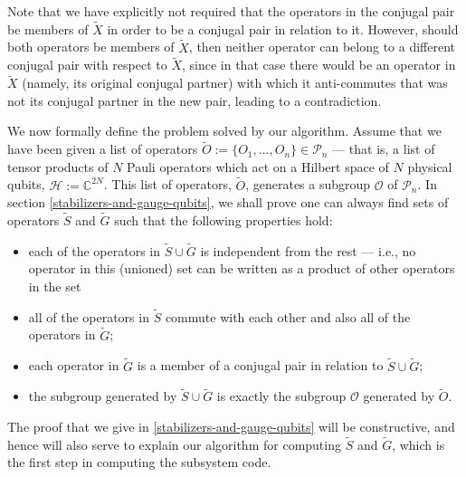 \documentclass[twocolumn,showpacs,preprintnumbers,amsmath,amssymb,nofootinbib,pra,floatfix]{revtex4}
\newcommand{\set}{\tilde}
\begin{document}
Note that we have explicitly not required that the operators in the conjugal pair be members of $\set X$ in order to be a conjugal pair in relation to it.  However, should both operators be members of $\set X$, then neither operator can belong to a different conjugal pair with respect to $\set X$, since in that case there would be an operator in $\set X$ (namely, its original conjugal partner) with which it anti-commutes that was not its conjugal partner in the new pair, leading to a contradiction.

We now formally define the problem solved by our algorithm.  Assume that we have been given a list of operators $\set O :=\{O_1,\dots,O_n\}\in \mathcal{P}_n$ --- that is, a list of tensor products of $N$ Pauli operators which act on a Hilbert space of $N$ physical qubits, $\mathscr{H}:=\mathbb{C}^{2N}$.  This list of operators, $\set O$, generates a subgroup $\mathcal{O}$ of $\mathcal{P}_n$.  In section \ref{stabilizers-and-gauge-qubits}, we shall prove one can always find sets of operators $\set S$ and $\set G$ such that the following properties hold:
\begin{itemize}
\item each of the operators in $\set S \cup \set G$ is
  independent from the rest --- i.e., no operator in this (unioned) set can
  be written as a product of other operators in the set
\item all of the operators in $\set S$ commute with each other and
  also all of the operators in $\set G$;
\item each operator in $\set G$ is a member of a conjugal pair in relation to $\set S \cup \set G$;
\item the subgroup generated by $\set S \cup \set G$ is exactly
  the subgroup $\mathcal{O}$ generated by $\set O$.
\end{itemize}
The proof that we give in \ref{stabilizers-and-gauge-qubits} will be
constructive, and hence will also serve to explain our algorithm for
computing $\set S$ and $\set G$, which is the first step in
computing the subsystem code.
\end{document}
